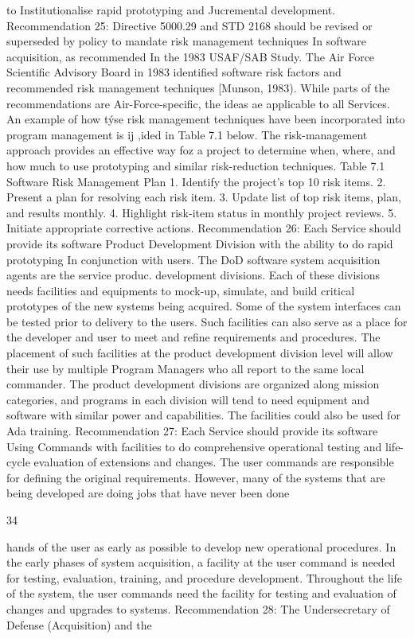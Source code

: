 \documentclass[12pt]{article}
\begin{document}
to Institutionalise rapid prototyping and Jucremental development.
Recommendation 25: Directive 5000.29 and STD 2168 should be revised
or superseded by policy to mandate risk management techniques In software
acquisition, as recommended In the 1983 USAF/SAB Study.
The Air Force Scientific Advisory Board in 1983 identified software risk factors and
recommended risk management techniques [Munson, 1983). While parts of the recommendations are Air-Force-specific, the ideas ae applicable to all Services. An example of how
týse risk management techniques have been incorporated into program management is
ij ,ided in Table 7.1 below. The risk-management approach provides an effective way
foz a project to determine when, where, and how much to use prototyping and similar
risk-reduction techniques.
Table 7.1
Software Risk Management Plan
1. Identify the project's top 10 risk items.
2. Present a plan for resolving each risk item.
3. Update list of top risk items, plan, and results monthly.
4. Highlight risk-item status in monthly project reviews.
5. Initiate appropriate corrective actions.
Recommendation 26: Each Service should provide its software Product
Development Division with the ability to do rapid prototyping In conjunction
with users.
The DoD software system acquisition agents are the service produc. development
divisions. Each of these divisions needs facilities and equipments to mock-up, simulate, and
build critical prototypes of the new systems being acquired. Some of the system interfaces
can be tested prior to delivery to the users. Such facilities can also serve as a place for
the developer and user to meet and refine requirements and procedures. The placement
of such facilities at the product development division level will allow their use by multiple
Program Managers who all report to the same local commander. The product development
divisions are organized along mission categories, and programs in each division will tend
to need equipment and software with similar power and capabilities. The facilities could
also be used for Ada training.
Recommendation 27: Each Service should provide its software Using Commands with facilities to do comprehensive operational testing and life-cycle
evaluation of extensions and changes.
The user commands are responsible for defining the original requirements. However,
many of the systems that are being developed are doing jobs that have never been done

34

hands of the user as early as possible to develop new operational procedures. In the
early phases of system acquisition, a facility at the user command is needed for testing,
evaluation, training, and procedure development. Throughout the life of the system, the
user commands need the facility for testing and evaluation of changes and upgrades to
systems.
Recommendation 28: The Undersecretary of Defense (Acquisition) and the
\end{document}
